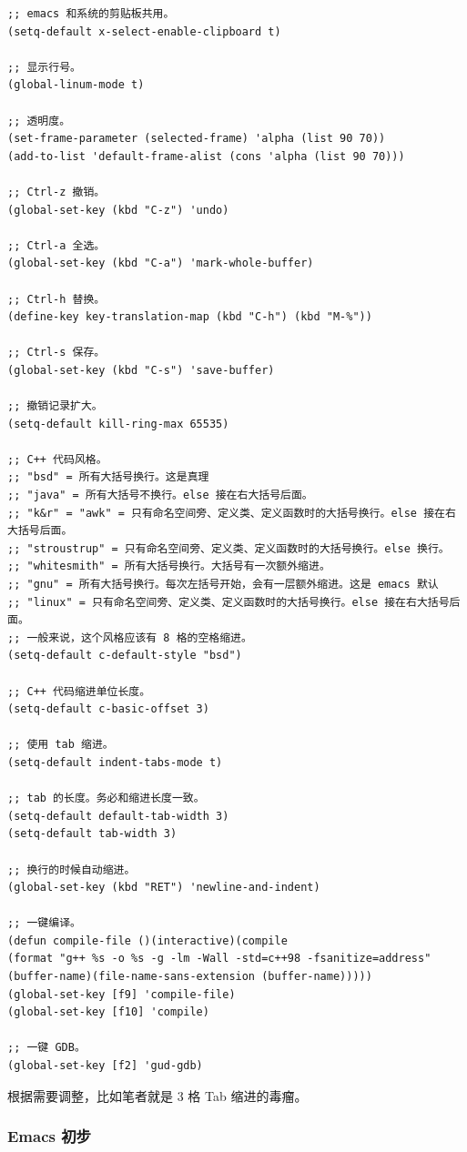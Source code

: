 \documentclass[UTF-8]{ctexart}
\begin{document}
				\begin{verbatim}
;; emacs 和系统的剪贴板共用。
(setq-default x-select-enable-clipboard t)

;; 显示行号。
(global-linum-mode t)

;; 透明度。
(set-frame-parameter (selected-frame) 'alpha (list 90 70))
(add-to-list 'default-frame-alist (cons 'alpha (list 90 70)))

;; Ctrl-z 撤销。
(global-set-key (kbd "C-z") 'undo)

;; Ctrl-a 全选。
(global-set-key (kbd "C-a") 'mark-whole-buffer)

;; Ctrl-h 替换。
(define-key key-translation-map (kbd "C-h") (kbd "M-%"))

;; Ctrl-s 保存。
(global-set-key (kbd "C-s") 'save-buffer)

;; 撤销记录扩大。
(setq-default kill-ring-max 65535)

;; C++ 代码风格。
;; "bsd" = 所有大括号换行。这是真理
;; "java" = 所有大括号不换行。else 接在右大括号后面。
;; "k&r" = "awk" = 只有命名空间旁、定义类、定义函数时的大括号换行。else 接在右大括号后面。
;; "stroustrup" = 只有命名空间旁、定义类、定义函数时的大括号换行。else 换行。
;; "whitesmith" = 所有大括号换行。大括号有一次额外缩进。
;; "gnu" = 所有大括号换行。每次左括号开始，会有一层额外缩进。这是 emacs 默认
;; "linux" = 只有命名空间旁、定义类、定义函数时的大括号换行。else 接在右大括号后面。
;; 一般来说，这个风格应该有 8 格的空格缩进。
(setq-default c-default-style "bsd")

;; C++ 代码缩进单位长度。
(setq-default c-basic-offset 3)

;; 使用 tab 缩进。
(setq-default indent-tabs-mode t)

;; tab 的长度。务必和缩进长度一致。
(setq-default default-tab-width 3)
(setq-default tab-width 3)

;; 换行的时候自动缩进。
(global-set-key (kbd "RET") 'newline-and-indent)

;; 一键编译。
(defun compile-file ()(interactive)(compile 
(format "g++ %s -o %s -g -lm -Wall -std=c++98 -fsanitize=address" 
(buffer-name)(file-name-sans-extension (buffer-name)))))
(global-set-key [f9] 'compile-file)
(global-set-key [f10] 'compile)

;; 一键 GDB。
(global-set-key [f2] 'gud-gdb)
				\end{verbatim}
				
				根据需要调整，比如笔者就是 3 格 Tab 缩进的毒瘤。
				
			\subsubsection{Emacs 初步}
				
\end{document}
